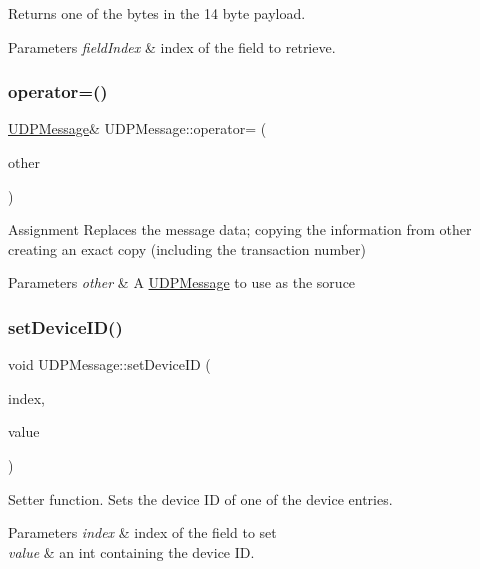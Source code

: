 Returns one of the bytes in the 14 byte payload. 
\begin{DoxyParams}{Parameters}
{\em field\+Index} & index of the field to retrieve. \\
\hline
\end{DoxyParams}
\mbox{\label{class_u_d_p_message_af3bb7f16fec948bcfbf99646b79c5c58}} 
\subsubsection{\texorpdfstring{operator=()}{operator=()}}
{\footnotesize\ttfamily \hyperlink{class_u_d_p_message}{U\+D\+P\+Message}\& U\+D\+P\+Message\+::operator= (\begin{DoxyParamCaption}\item[{const \hyperlink{class_u_d_p_message}{U\+D\+P\+Message} \&}]{other }\end{DoxyParamCaption})\hspace{0.3cm}{\ttfamily [inline]}}

Assignment Replaces the message data; copying the information from other creating an exact copy (including the transaction number) 
\begin{DoxyParams}{Parameters}
{\em other} & A \hyperlink{class_u_d_p_message}{U\+D\+P\+Message} to use as the soruce \\
\hline
\end{DoxyParams}
\mbox{\label{class_u_d_p_message_a9cf9c5e20119a221ee36412e0c1d39c5}} 
\subsubsection{\texorpdfstring{set\+Device\+I\+D()}{setDeviceID()}}
{\footnotesize\ttfamily void U\+D\+P\+Message\+::set\+Device\+ID (\begin{DoxyParamCaption}\item[{unsigned char}]{index,  }\item[{int}]{value }\end{DoxyParamCaption})\hspace{0.3cm}{\ttfamily [inline]}}

Setter function. Sets the device ID of one of the device entries. 
\begin{DoxyParams}{Parameters}
{\em index} & index of the field to set \\
\hline
{\em value} & an int containing the device ID. \\
\hline
\end{DoxyParams}
\mbox{\label{class_u_d_p_message_a2dcad6fc97802808675fb9259727da64}} 
